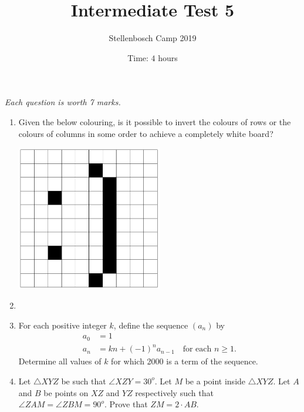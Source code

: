 \documentclass{article}
\title{Intermediate Test 5}
\author{Stellenbosch Camp 2019}
\date{Time: $4$ hours}
\begin{document}
\maketitle
\thispagestyle{empty}

\hfill\textit{Each question is worth 7 marks.}

\vfill
\vfill


\begin{enumerate}[1.]

\item %
Given the below colouring, is it possible to invert the colours of rows or the colours of columns in some order to achieve a completely white board?
\begin{center}
    \includegraphics[width=0.5\textwidth]{test_5_q_1.png}
\end{center}

\vfill

\item %


\vfill

\item %
For each positive integer $k$, define the sequence $(a_{n})$ by
\begin{align*}
	a_{0} &= 1 \\
	a_{n} &= kn + (-1)^{n}a_{n-1} \quad \text{for each } n \geqslant 1.
\end{align*}
Determine all values of $k$ for which 2000 is a term of the sequence.


\vfill

\item %
Let $\triangle XYZ$ be such that $\angle XZY = 30^o$. Let $M$ be a point inside $\triangle XYZ$. Let $A$ and $B$ be points on $XZ$ and $YZ$ respectively such that $\angle ZAM = \angle ZBM = 90^o$. Prove that $ZM = 2 \cdot AB$.


\end{enumerate}
\end{document}
